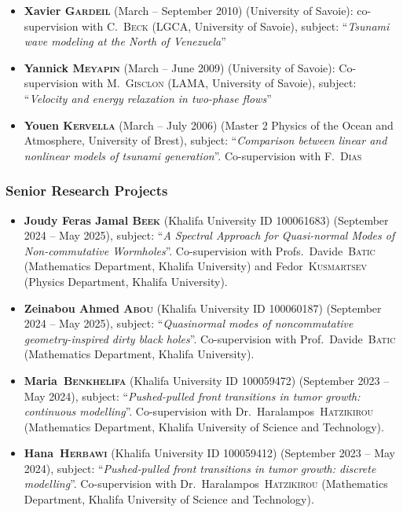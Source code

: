 \documentclass[final, a4paper, oneside, 12pt]{article}
\numberwithin{equation}{section}
\begin{document}
\begin{itemize}
  \item \textbf{Xavier \textsc{Gardeil}} (March -- September 2010) (University of Savoie): co-supervision with C.~\textsc{Beck} (LGCA, University of Savoie), subject: ``\textit{Tsunami wave modeling at the North of Venezuela}''
  
  \item \textbf{Yannick \textsc{Meyapin}} (March -- June 2009) (University of Savoie): Co-supervision with M.~\textsc{Gisclon} (LAMA, University of Savoie), subject: ``\textit{Velocity and energy relaxation in two-phase flows}''
  
  \item \textbf{Youen \textsc{Kervella}} (March -- July 2006) (Master 2 Physics of the Ocean and Atmosphere, University of Brest), subject: ``\textit{Comparison between linear and nonlinear models of tsunami generation}''. Co-supervision with F.~\textsc{Dias}
  
\end{itemize}

\subsubsection{Senior Research Projects}

\begin{itemize}

  \item \textbf{Joudy Feras Jamal \textsc{Beek}} (Khalifa University ID 100061683) (September 2024 -- May 2025), subject: ``\textit{A Spectral Approach for Quasi-normal Modes of Non-commutative Wormholes}''. Co-supervision with Profs.~Davide~\textsc{Batic} (Mathematics Department, Khalifa University) and Fedor~\textsc{Kusmartsev} (Physics Department, Khalifa University).
  
  \item \textbf{Zeinabou Ahmed \textsc{Abou}} (Khalifa University ID 100060187) (September 2024 -- May 2025), subject: ``\textit{Quasinormal modes of noncommutative geometry-inspired dirty black holes}''. Co-supervision with Prof.~Davide~\textsc{Batic} (Mathematics Department, Khalifa University).

  \item \textbf{Maria~\textsc{Benkhelifa}} (Khalifa University ID 100059472) (September 2023 -- May 2024), subject: ``\textit{Pushed-pulled front transitions in tumor growth: continuous modelling}''. Co-supervision with Dr.~Haralampos~\textsc{Hatzikirou} (Mathematics Department, Khalifa University of Science and Technology).

  \item \textbf{Hana~\textsc{Herbawi}} (Khalifa University ID 100059412) (September 2023 -- May 2024), subject: ``\textit{Pushed-pulled front transitions in tumor growth: discrete modelling}''. Co-supervision with Dr.~Haralampos~\textsc{Hatzikirou} (Mathematics Department, Khalifa University of Science and Technology).
    
\end{itemize}
\end{document}
